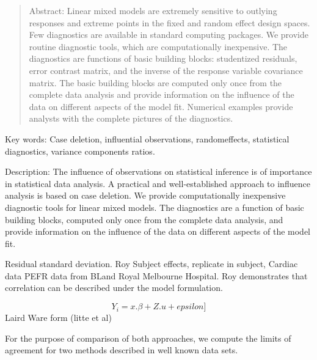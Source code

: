 \documentclass[12pt, a4paper]{article}
\begin{document}
\begin{quote}
	Abstract: Linear mixed models are extremely sensitive to outlying responses and extreme points in the fixed and random effect design spaces. Few diagnostics are available in standard computing packages. We provide routine diagnostic tools, which are computationally inexpensive. The diagnostics
	are functions of basic building blocks: studentized residuals, error contrast matrix, and the inverse of the response variable covariance matrix. The basic building blocks are computed only once from the complete data analysis and provide information on the influence of the data on different aspects
	of the model fit. Numerical examples provide analysts with the complete pictures of the diagnostics.
\end{quote}
Key words: Case deletion, influential observations, randomeffects, statistical
diagnostics, variance components ratios.


Description: The influence of observations on statistical inference is of importance in statistical data analysis. 
A practical and well-established approach to influence analysis is based on case deletion. 
We provide computationally inexpensive diagnostic tools for linear mixed models. 
The diagnostics are a function of basic building blocks, computed only once from the complete data analysis, 
and provide information on the influence of the data on different aspects of the model fit.


Residual standard deviation.
Roy Subject effects, replicate in subject,
Cardiac data PEFR data from BLand
Royal Melbourne Hospital.
Roy demonstrates that correlation can be described under the model formulation.

\[Y_i = x.\beta + Z.u + epsilon]\]
Laird Ware form (litte et al)




For the purpose of comparison of both approaches, we compute the limits of agreement for two methods described in 
well known data sets.

\end{document}
